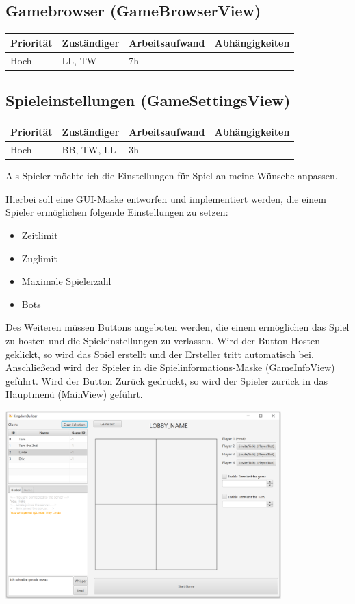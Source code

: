 \documentclass[a4paper]{scrreprt}
\newenvironment{requirement}[5] {
	\subsection{#1}
	\begin{tabularx}{\textwidth}{|X|l|X|X|}
		\hline
		Priorität & Zuständiger & Arbeitsaufwand & Abhängigkeiten \\
		\hline
		#2 & #3 & #4 & #5 \\
		\hline
	\end{tabularx}
	}{
	\newpage
	}
\begin{document}
\begin{requirement}{Gamebrowser (GameBrowserView)}{Hoch}{LL, TW}{7h}{-}
\end{requirement}


\begin{requirement}{Spieleinstellungen (GameSettingsView)}{Hoch}{BB, TW, LL}{3h}{-}

\begin{center}
	Als Spieler möchte ich die Einstellungen für Spiel an meine Wünsche anpassen.
\end{center}

Hierbei soll eine GUI-Maske entworfen und implementiert werden, die einem Spieler ermöglichen folgende Einstellungen zu setzen:

\begin{itemize}
	\item Zeitlimit
	\item Zuglimit
	\item Maximale Spielerzahl
	\item Bots
\end{itemize}

Des Weiteren müssen Buttons angeboten werden, die einem ermöglichen das Spiel zu \glqq hosten\grqq{} und die Spieleinstellungen zu verlassen.
Wird der Button \glqq
Hosten\grqq{} geklickt, so wird das Spiel erstellt und der Ersteller tritt automatisch bei. Anschließend wird der Spieler in die Spielinformations-Maske (\glqq GameInfoView\grqq{}) geführt. Wird der Button \glqq Zurück\grqq{} gedrückt, so wird der Spieler zurück in das Hauptmenü (\glqq MainView\grqq{}) geführt.

\includegraphics[width=0.8\textwidth]{view4.png}

\end{requirement}
\end{document}
